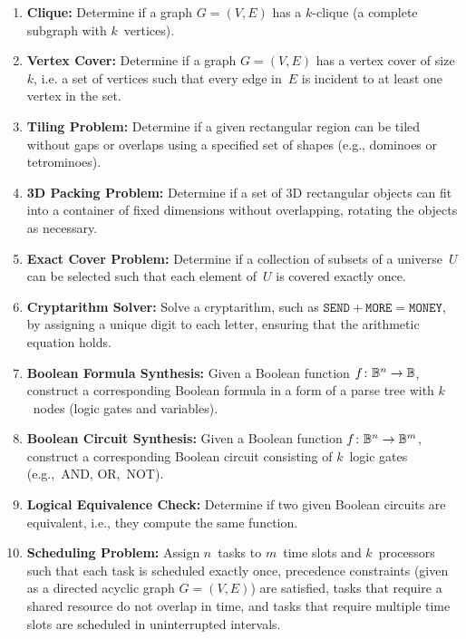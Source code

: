 \documentclass[a4paper,12pt]{article}
\begin{document}
\begin{tasks}
\begin{enumerate}[start=0]
        \item \textbf{Clique:} Determine if a graph $G = (V, E)$ has a $k$-clique (a complete subgraph with $k$~vertices).

        \item \textbf{Vertex Cover:} Determine if a graph $G = (V, E)$ has a vertex cover of size~$k$, i.e. a set of vertices such that every edge in~$E$ is incident to at least one vertex in the set.

        \item \textbf{Tiling Problem:} Determine if a given rectangular region can be tiled without gaps or overlaps using a specified set of shapes (e.g., dominoes or tetrominoes).

        \item \textbf{3D Packing Problem:} Determine if a set of 3D rectangular objects can fit into a container of fixed dimensions without overlapping, rotating the objects as necessary.

        \item \textbf{Exact Cover Problem:} Determine if a collection of subsets of a universe~$U$ can be selected such that each element of~$U$ is covered exactly once.

        \item \textbf{Cryptarithm Solver:} Solve a cryptarithm, such as $\mathtt{SEND} + \mathtt{MORE} = \mathtt{MONEY}$, by assigning a unique digit to each letter, ensuring that the arithmetic equation holds.

        \item \textbf{Boolean Formula Synthesis:} Given a Boolean function $f \colon \mathbb{B}^n \to \mathbb{B}$, construct a corresponding Boolean formula in a form of a parse tree with $k$~nodes (logic gates and variables).

        \item \textbf{Boolean Circuit Synthesis:} Given a Boolean function $f \colon \mathbb{B}^n \to \mathbb{B}^m$, construct a corresponding Boolean circuit consisting of $k$~logic gates (e.g.,~AND, OR,~NOT).

        \item \textbf{Logical Equivalence Check:} Determine if two given Boolean circuits are equivalent, i.e., they compute the same function.

        \item \textbf{Scheduling Problem:} Assign $n$~tasks to $m$~time slots and $k$~processors such that each task is scheduled exactly once, precedence constraints (given as a directed acyclic graph $G = (V, E)$) are satisfied, tasks that require a shared resource do not overlap in time, and tasks that require multiple time slots are scheduled in uninterrupted intervals.


\end{enumerate}
\end{tasks}
\end{document}

